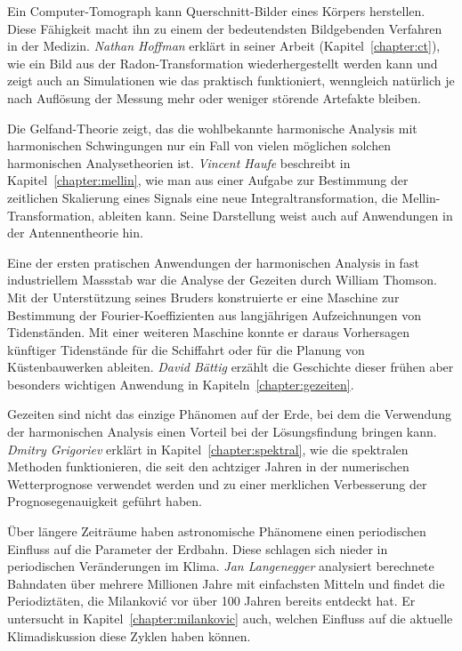 Ein Computer-Tomograph kann Querschnitt-Bilder eines Körpers
herstellen.
Diese Fähigkeit macht ihn zu einem der bedeutendsten Bildgebenden
Verfahren in der Medizin.
{\em Nathan Hoffman} erklärt in seiner Arbeit (Kapitel~\ref{chapter:ct}),
wie ein Bild aus der
Radon-Transformation wiederhergestellt werden kann und zeigt auch
an Simulationen wie das praktisch funktioniert, wenngleich natürlich
je nach Auflösung der Messung mehr oder weniger störende Artefakte bleiben.

Die Gelfand-Theorie zeigt, das die wohlbekannte harmonische
Analysis mit harmonischen Schwingungen nur ein Fall von vielen
möglichen solchen harmonischen Analysetheorien ist.
{\em Vincent Haufe} beschreibt in Kapitel~\ref{chapter:mellin},
wie man aus einer Aufgabe
zur Bestimmung der zeitlichen Skalierung eines Signals eine
neue Integraltransformation, die Mellin-Transformation, ableiten 
kann.
Seine Darstellung weist auch auf Anwendungen in der Antennentheorie
hin.

Eine der ersten pratischen Anwendungen der harmonischen Analysis in
fast industriellem Massstab war die Analyse der Gezeiten durch
William Thomson.
Mit der Unterstützung seines Bruders konstruierte er eine Maschine zur
Bestimmung der Fourier-Koeffizienten aus langjährigen Aufzeichnungen
von Tidenständen.
Mit einer weiteren Maschine konnte er daraus Vorhersagen künftiger
Tidenstände für die Schiffahrt oder für die Planung von Küstenbauwerken
ableiten.
{\em David Bättig} erzählt die Geschichte dieser frühen aber besonders
wichtigen Anwendung in Kapiteln~\ref{chapter:gezeiten}.

Gezeiten sind nicht das einzige Phänomen auf der Erde, bei dem die
Verwendung der harmonischen Analysis einen Vorteil bei der Lösungsfindung
bringen kann.
{\em Dmitry Grigoriev} erklärt in Kapitel~\ref{chapter:spektral},
wie die spektralen Methoden funktionieren, die seit den achtziger Jahren
in der numerischen Wetterprognose verwendet werden und zu einer
merklichen Verbesserung der Prognosegenauigkeit geführt haben.

Über längere Zeiträume haben astronomische Phänomene einen periodischen
Einfluss auf die Parameter der Erdbahn.
Diese schlagen sich nieder in periodischen Veränderungen im Klima.
{\em Jan Langenegger} analysiert berechnete Bahndaten über mehrere
Millionen Jahre mit einfachsten Mitteln und findet die Periodiztäten,
die Milankovi\'c vor über 100 Jahren bereits entdeckt hat.
Er untersucht in Kapitel~\ref{chapter:milankovic} auch, welchen Einfluss
auf die aktuelle Klimadiskussion diese Zyklen haben können.

